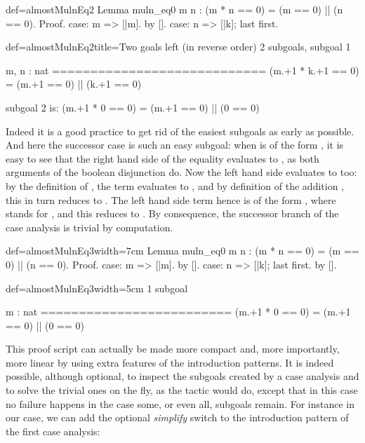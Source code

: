 \begin{coq}{def=almostMulnEq2}{}
Lemma muln_eq0 m n : (m * n == 0) = (m == 0) || (n == 0).
Proof.
case: m => [|m].
  by [].
case: n => [|k]; last first.
\end{coq}
\begin{coqout}{def=almostMulnEq2}{title=Two goals left (in reverse order)}
2 subgoals, subgoal 1

m, n : nat
============================
(m.+1 * k.+1 == 0) = (m.+1 == 0) || (k.+1 == 0)

subgoal 2 is:
 (m.+1 * 0 == 0) = (m.+1 == 0) || (0 == 0)
\end{coqout}
Indeed it is a good practice to get rid of the easiest subgoals as
early as possible. And here the successor case is such an easy
subgoal: when  is of the form , it is easy to see that the
right hand side of the equality evaluates to , as both
arguments of the boolean disjunction do. Now the left hand side
evaluates to  too: by the definition of , the term
 evaluates to , and by
definition of the addition , this in turn reduces to
. The left hand side term hence is of the form
, where  stands for , and this
reduces to .\label{proof:mulneq0}
By consequence, the successor branch of the case analysis is trivial
by computation.


\begin{coq}{def=almostMulnEq3}{width=7cm}
Lemma muln_eq0 m n :
  (m * n == 0) = (m == 0) || (n == 0).
Proof.
case: m => [|m].
  by [].
case: n => [|k]; last first.
  by [].
\end{coq}
\begin{coqout}{def=almostMulnEq3}{width=5cm}
1 subgoal

m : nat
=========================
(m.+1 * 0 == 0) =
  (m.+1 == 0) || (0 == 0)
\end{coqout}

This proof script can actually be made more compact and, more
importantly, more linear by using extra features of the introduction
patterns. It is indeed possible, although optional, to
inspect the subgoals created by a case analysis and to solve the
trivial ones on the fly, as the  tactic would do, except that
in this case no failure happens in the case some, or even all,
subgoals remain. For instance in our case,
we can add the optional \C{//} \emph{simplify} switch to the
introduction pattern of the first case analysis:

